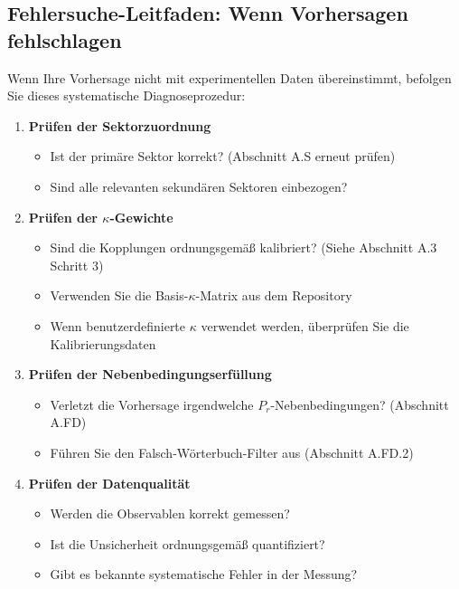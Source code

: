\documentclass[13pt,a4paper]{article}
\begin{document}
	\subsection*{Fehlersuche-Leitfaden: Wenn Vorhersagen fehlschlagen}
	
	Wenn Ihre Vorhersage nicht mit experimentellen Daten übereinstimmt, befolgen Sie dieses systematische Diagnoseprozedur:
	
	\begin{enumerate}
		\item \textbf{Prüfen der Sektorzuordnung} 
		\begin{itemize}
			\item Ist der primäre Sektor korrekt? (Abschnitt A.S erneut prüfen)
			\item Sind alle relevanten sekundären Sektoren einbezogen?
		\end{itemize}
		
		\item \textbf{Prüfen der $\kappa$-Gewichte}
		\begin{itemize}
			\item Sind die Kopplungen ordnungsgemäß kalibriert? (Siehe Abschnitt A.3 Schritt 3)
			\item Verwenden Sie die Basis-$\kappa$-Matrix aus dem Repository
			\item Wenn benutzerdefinierte $\kappa$ verwendet werden, überprüfen Sie die Kalibrierungsdaten
		\end{itemize}
		
		\item \textbf{Prüfen der Nebenbedingungserfüllung}
		\begin{itemize}
			\item Verletzt die Vorhersage irgendwelche $P_r$-Nebenbedingungen? (Abschnitt A.FD)
			\item Führen Sie den Falsch-Wörterbuch-Filter aus (Abschnitt A.FD.2)
		\end{itemize}
		
		\item \textbf{Prüfen der Datenqualität}
		\begin{itemize}
			\item Werden die Observablen korrekt gemessen?
			\item Ist die Unsicherheit ordnungsgemäß quantifiziert?
			\item Gibt es bekannte systematische Fehler in der Messung?
		\end{itemize}
		

\end{enumerate}
\end{document}
